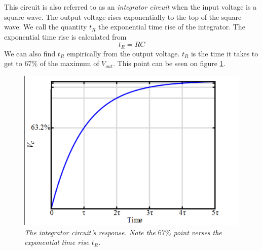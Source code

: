 \documentclass[11pt]{article}
\numberwithin{equation}{section}
\numberwithin{figure}{section}
\numberwithin{table}{section}
\begin{document}
This circuit is also referred to as an \emph{integrator circuit} when the input voltage is a square wave. The output voltage rises exponentially to the top of the square wave. We call the quantity $t_R$ the exponential time rise of the integrator. The exponential time rise is calculated from
\begin{equation}
t_R = RC
\label{TimeRise}
\end{equation}
We can also find $t_R$ empirically from the output voltage. $t_R$ is the time it takes to get to $67\%$ of the maximum of $V_{out}$. This point can be seen on figure \ref{Integ}.
\begin{figure}[h]
\centering
\includegraphics[scale=0.40]{Integ.eps}
\caption{\textit{The integrator circuit's response. Note the $67\%$ point verses the exponential time rise $t_R$.}}
\label{Integ}
\end{figure}
\end{document}
